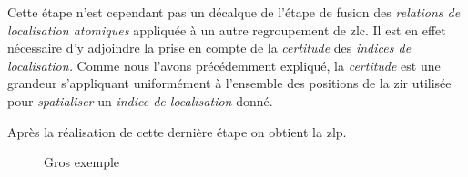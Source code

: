 Cette étape n'est cependant pas un décalque de l'étape de fusion des
\emph{relations de localisation atomiques} appliquée à un autre
regroupement de \ac{zlc}. Il est en effet nécessaire d'y adjoindre la
prise en compte de la \emph{certitude} des \emph{indices de
  localisation.} Comme nous l'avons précédemment expliqué, la
\emph{certitude} est une grandeur s'appliquant uniformément à
l'ensemble des positions de la \ac{zir} utilisée pour
\emph{spatialiser} un \emph{indice de localisation} donné.

Après la réalisation de cette dernière étape on obtient la \ac{zlp}.

\begin{landscape}
  \begin{figure}[H]
    \centering
    
    \caption{Gros exemple}
    \label{fig:exemple_final_fusion}
  \end{figure}
\end{landscape}


